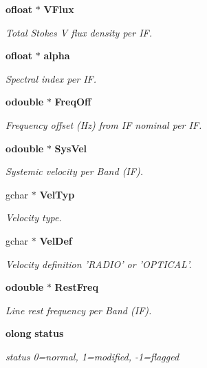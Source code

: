 \begin{CompactItemize}
{\bf ofloat} $\ast$ {\bf VFlux}
\begin{CompactList}\small\item\em Total Stokes V flux density per IF. \item\end{CompactList}\item 
{\bf ofloat} $\ast$ {\bf alpha}
\begin{CompactList}\small\item\em Spectral index per IF. \item\end{CompactList}\item 
{\bf odouble} $\ast$ {\bf Freq\-Off}
\begin{CompactList}\small\item\em Frequency offset (Hz) from IF nominal per IF. \item\end{CompactList}\item 
{\bf odouble} $\ast$ {\bf Sys\-Vel}
\begin{CompactList}\small\item\em Systemic velocity per Band (IF). \item\end{CompactList}\item 
gchar $\ast$ {\bf Vel\-Typ}
\begin{CompactList}\small\item\em Velocity type. \item\end{CompactList}\item 
gchar $\ast$ {\bf Vel\-Def}
\begin{CompactList}\small\item\em Velocity definition 'RADIO' or 'OPTICAL'. \item\end{CompactList}\item 
{\bf odouble} $\ast$ {\bf Rest\-Freq}
\begin{CompactList}\small\item\em Line rest frequency per Band (IF). \item\end{CompactList}\item 
{\bf olong} {\bf status}
\begin{CompactList}\small\item\em status 0=normal, 1=modified, -1=flagged \item\end{CompactList}\end{CompactItemize}


